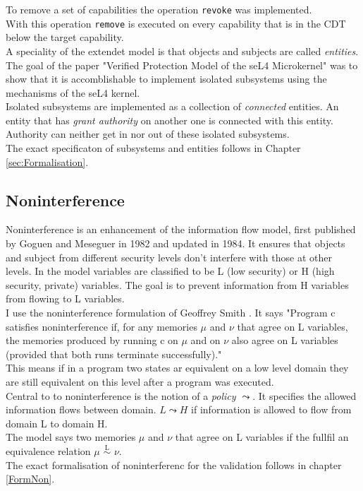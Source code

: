 \documentclass[11pt,a4paper,twoside]{article}
\begin{document}
	To remove a set of capabilities the operation \texttt{revoke} was implemented. \\ 
	With this operation \texttt{remove} is executed on every capability that is in the CDT below the target capability. \\
	A speciality of the extendet model is that objects and subjects are called \textit{entities}.\\
	The goal of the paper "Verified Protection Model of the seL4 Microkernel" was to show that it is accomblishable to implement isolated subsystems using the mechanisms of the seL4 kernel. \cite{TakeG} \\
	Isolated subsystems are implemented as a collection of \textit{connected} entities. An entity that has \textit{grant authority} on another one is connected with this entity. Authority can neither get in nor out of these isolated subsystems.\\
	The exact specificaton of subsystems and entities follows in Chapter \ref{sec:Formalisation}.
	
	\subsection{Noninterference}
	Noninterference is an enhancement of the information flow model, first published by Goguen and Meseguer in 1982 and updated in 1984. It ensures that objects and subject from different security levels don't interfere with those at other levels. In the model variables are classified to be L (low security) or H (high security, private) variables. The goal is to prevent information from H variables from flowing to L variables. \\
	I use the noninterference formulation of Geoffrey Smith \cite{InfFlow}. It says "Program c satisfies noninterference if, for
any memories $\mu$ and $\nu$ that agree on L variables, the memories produced by
running c on $\mu$ and on $\nu$ also agree on L variables (provided that both runs
terminate successfully)." \\
This means if in a program two states ar equivalent on a low level domain they are still equivalent on this level after a program was executed.\\
Central to to noninterference is the notion of a \textit{policy} $\leadsto$. It specifies the allowed information  flows between domain. $L \leadsto H$ if information is allowed to flow from domain L to domain H. \\
The model says two memories $\mu$ and $\nu$ that agree on L variables if the fullfil an equivalence relation $\mu$ $\overset{\text{L}}{\sim}$ $\nu$. \\
	The exact formalisation of noninterferenc for the validation follows in chapter \ref{FormNon}.
	\newpage
\end{document}
